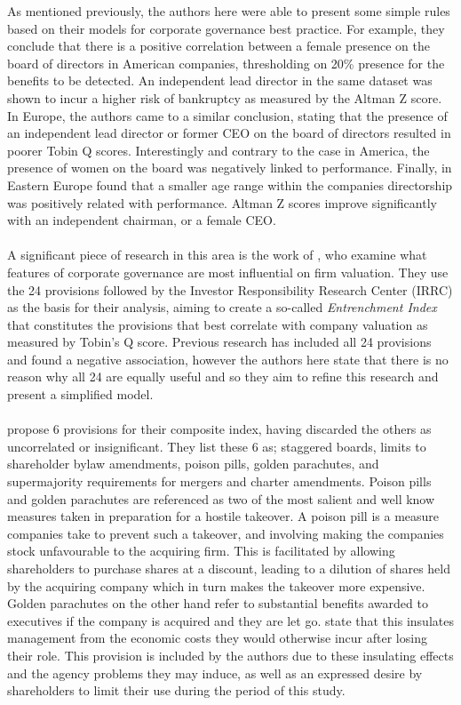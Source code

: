 {{As mentioned previously, the authors here were able to present some simple rules based on their models for corporate governance best practice. For example, they conclude that there is a positive correlation between a female presence on the board of directors in American companies, thresholding on 20\% presence for the benefits to be detected. An independent lead director in the same dataset was shown to incur a higher risk of bankruptcy as measured by the Altman Z score. In Europe, the authors came to a similar conclusion, stating that the presence of an independent lead director or former CEO on the board of directors resulted in poorer Tobin Q scores. Interestingly and contrary to the case in America, the presence of women on the board was negatively linked to performance. Finally, in Eastern Europe \cite{moldovan2015learning} found that a smaller age range within the companies directorship was positively related with performance. Altman Z scores improve significantly with an independent chairman, or a female CEO. \\\\
A significant piece of research in this area is the work of \cite{bebchukWhatMatters}, who examine what features of corporate governance are most influential on firm valuation. They use the 24 provisions followed by the Investor Responsibility Research Center (IRRC) as the basis for their analysis, aiming to create a so-called {\it Entrenchment Index} that constitutes the provisions that best correlate with company valuation as measured by Tobin's Q score. Previous research has included all 24 provisions and found a negative association, however the authors here state that there is no reason why all 24 are equally useful and so they aim to refine this research and present a simplified model. \\\\
\cite{bebchukWhatMatters} propose 6 provisions for their composite index, having discarded the others as uncorrelated or insignificant. They list these 6 as; staggered boards, limits to shareholder bylaw amendments, poison pills, golden parachutes, and supermajority requirements for mergers and charter amendments. Poison pills and golden parachutes are referenced as two of the most salient and well know measures taken in preparation for a hostile takeover. A poison pill is a measure companies take to prevent such a takeover, and involving making the companies stock unfavourable to the acquiring firm. This is facilitated by allowing shareholders to purchase shares at a discount, leading to a dilution of shares held by the acquiring company which in turn makes the takeover more expensive. Golden parachutes on the other hand refer to substantial benefits awarded to executives if the company is acquired and they are let go. \cite{bebchukWhatMatters} state that this insulates management from the economic costs they would otherwise incur after losing their role. This provision is included by the authors due to these insulating effects and the agency problems they may induce, as well as an expressed desire by shareholders to limit their use during the period of this study. \\\\
}}
